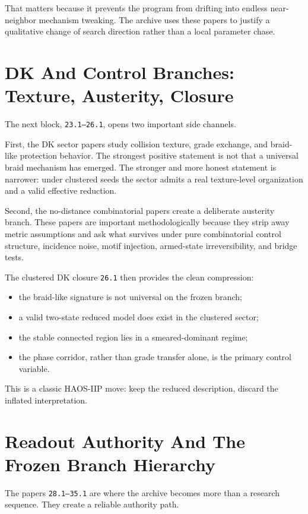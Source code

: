 \documentclass[11pt]{article}
\begin{document}
That matters because it prevents the program from drifting into endless near-neighbor mechanism tweaking. The archive uses these papers to justify a qualitative change of search direction rather than a local parameter chase.

\section{DK And Control Branches: Texture, Austerity, Closure}

The next block, \texttt{23.1--26.1}, opens two important side channels.

First, the DK sector papers study collision texture, grade exchange, and braid-like protection behavior. The strongest positive statement is not that a universal braid mechanism has emerged. The stronger and more honest statement is narrower: under clustered seeds the sector admits a real texture-level organization and a valid effective reduction.

Second, the no-distance combinatorial papers create a deliberate austerity branch. These papers are important methodologically because they strip away metric assumptions and ask what survives under pure combinatorial control structure, incidence noise, motif injection, armed-state irreversibility, and bridge tests.

The clustered DK closure \texttt{26.1} then provides the clean compression:
\begin{itemize}
\item the braid-like signature is not universal on the frozen branch;
\item a valid two-state reduced model does exist in the clustered sector;
\item the stable connected region lies in a smeared-dominant regime;
\item the phase corridor, rather than grade transfer alone, is the primary control variable.
\end{itemize}

This is a classic HAOS-IIP move: keep the reduced description, discard the inflated interpretation.

\section{Readout Authority And The Frozen Branch Hierarchy}

The papers \texttt{28.1--35.1} are where the archive becomes more than a research sequence. They create a reliable authority path.
\end{document}
